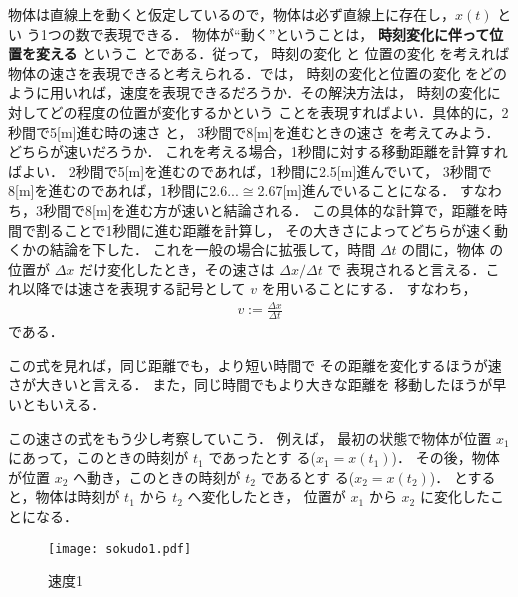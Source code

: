                 物体は直線上を動くと仮定しているので，物体は必ず直線上に存在し，$x(t)$ とい
                う1つの数で表現できる．
                物体が“動く”ということは， \textbf{時刻変化に伴って位置を変える} というこ
                とである．従って，
                時刻の変化 と 位置の変化 を考えれば物体の速さを表現できると考えられる．では，
                時刻の変化と位置の変化
                をどのように用いれば，速度を表現できるだろうか．その解決方法は，
                時刻の変化に対してどの程度の位置が変化するかという
                ことを表現すればよい．具体的に，2秒間で5[m]進む時の速さ と，
                3秒間で8[m]を進むときの速さ を考えてみよう．どちらが速いだろうか．
                これを考える場合，1秒間に対する移動距離を計算すればよい．
                2秒間で5[m]を進むのであれば，1秒間に2.5[m]進んでいて，
                3秒間で8[m]を進むのであれば，1秒間に2.6...$\cong$2.67[m]進んでいることになる．
                すなわち，3秒間で8[m]を進む方が速いと結論される．
                この具体的な計算で，距離を時間で割ることで1秒間に進む距離を計算し，
                その大きさによってどちらが速く動くかの結論を下した．
                これを一般の場合に拡張して，時間 $\Delta t$ の間に，物体
                の位置が $\Delta x$ だけ変化したとき，その速さは $\Delta x/\Delta t$ で
                表現されると言える．これ以降では速さを表現する記号として $v$ を用いることにする．
                すなわち，
                \begin{align}
                    v:=\frac{\Delta x}{\Delta t}
                \end{align}
                である．

                この式を見れば，同じ距離でも，より短い時間で
                その距離を変化するほうが速さが大きいと言える．
                また，同じ時間でもより大きな距離を
                移動したほうが早いともいえる．

                この速さの式をもう少し考察していこう．
                例えば，
                最初の状態で物体が位置 $x_{1}$ にあって，このときの時刻が $t_{1}$ であったとす
                る($x_{1}=x(t_{1})$)．
                その後，物体が位置 $x_{2}$ へ動き，このときの時刻が $t_{2}$ であるとす
                る($x_{2}=x(t_{2})$)．
                とすると，物体は時刻が $t_{1}$ から $t_{2}$ へ変化したとき，
                位置が $x_{1}$ から $x_{2}$ に変化したことになる．
                \begin{figure}[hbt]
                    \begin{center}
                        \texttt{[image: sokudo1.pdf]}
                    \end{center}
                    \label{fig:sokudo1}
                    \caption{速度1}
                \end{figure}

